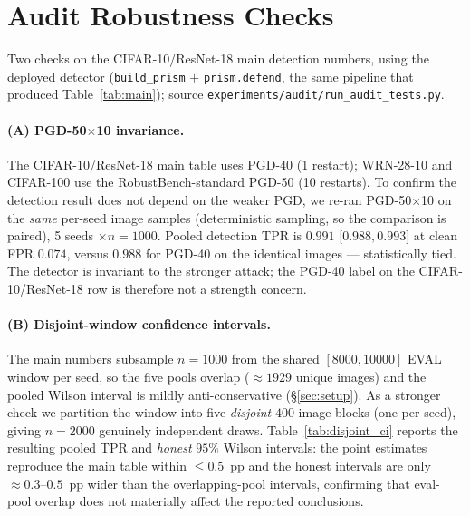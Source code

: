 
\section{Audit Robustness Checks}
\label{app:audit}

Two checks on the CIFAR-10/ResNet-18 main detection numbers, using the
deployed detector (\texttt{build\_prism} $+$ \texttt{prism.defend}, the same
pipeline that produced Table~\ref{tab:main}); source
\texttt{experiments/audit/run\_audit\_tests.py}.

\paragraph{(A) PGD-50$\times$10 invariance.}
The CIFAR-10/ResNet-18 main table uses PGD-40 (1 restart); WRN-28-10 and
CIFAR-100 use the RobustBench-standard PGD-50 (10 restarts). To confirm the
detection result does not depend on the weaker PGD, we re-ran PGD-50$\times$10
on the \emph{same} per-seed image samples (deterministic sampling, so the
comparison is paired), 5 seeds $\times n{=}1000$. Pooled detection TPR is
$0.991$ [$0.988, 0.993$] at clean FPR $0.074$, versus $0.988$ for PGD-40 on the
identical images --- statistically tied. The detector is invariant to the
stronger attack; the PGD-40 label on the CIFAR-10/ResNet-18 row is therefore
not a strength concern.

\paragraph{(B) Disjoint-window confidence intervals.}
The main numbers subsample $n{=}1000$ from the shared $[8000,10000]$ EVAL
window per seed, so the five pools overlap ($\approx 1929$ unique images) and
the pooled Wilson interval is mildly anti-conservative
(\S\ref{sec:setup}). As a stronger check we partition the window into five
\emph{disjoint} $400$-image blocks (one per seed), giving $n{=}2000$ genuinely
independent draws. Table~\ref{tab:disjoint_ci} reports the resulting pooled TPR
and \emph{honest} $95\%$ Wilson intervals: the point estimates reproduce the
main table within $\le 0.5$~pp and the honest intervals are only $\approx
0.3$--$0.5$~pp wider than the overlapping-pool intervals, confirming that
eval-pool overlap does not materially affect the reported conclusions.

